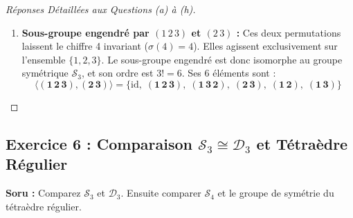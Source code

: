 \documentclass[12pt,a4paper]{report}
\begin{document}
\begin{proof}[Réponses Détaillées aux Questions (a) à (h)]
\begin{enumerate}
    \item[(h)] \textbf{Sous-groupe engendré par $(1\,2\,3)$ et $(2\,3)$ :}  
    Ces deux permutations laissent le chiffre 4 invariant ($\sigma(4) = 4$). Elles agissent exclusivement sur l'ensemble $\{1, 2, 3\}$.  
    Le sous-groupe engendré est donc isomorphe au groupe symétrique $\mathcal{S}_3$, et son ordre est $3! = 6$.  
    Ses 6 éléments sont :
    \[ \mathbf{\langle (1\,2\,3), (2\,3) \rangle = \{ \mathrm{id}, \; (1\,2\,3), \; (1\,3\,2), \; (2\,3), \; (1\,2), \; (1\,3) \}} \]
\end{enumerate}
\end{proof}

\vspace{0.5cm}

\subsection*{Exercice 6 : Comparaison $\mathcal{S}_3 \cong \mathcal{D}_3$ et Tétraèdre Régulier}
\textbf{Soru :} Comparez $\mathcal{S}_3$ et $\mathcal{D}_3$. Ensuite comparer $\mathcal{S}_4$ et le groupe de symétrie du tétraèdre régulier.
\end{document}
